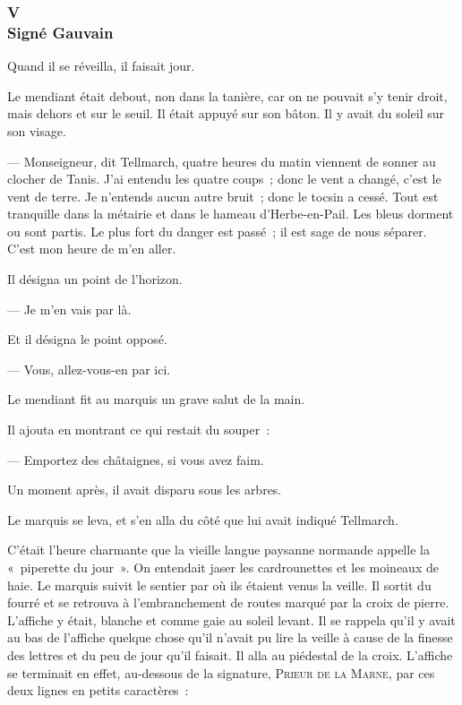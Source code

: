 \documentclass[french,twoside]{book} %
\begin{document}
 \subsubsection[{V. Signé Gauvain}]{V \\
Signé Gauvain}
\label{p1l4c5}
\noindent Quand il se réveilla, il faisait jour.\par
Le mendiant était debout, non dans la tanière, car on ne pouvait s’y tenir droit, mais dehors et sur le seuil. Il était appuyé sur son bâton. Il y avait du soleil sur son visage.\par
— Monseigneur, dit Tellmarch, quatre heures du matin viennent de sonner au clocher de Tanis. J’ai entendu les quatre coups ; donc le vent a changé, c’est le vent de terre. Je n’entends aucun autre bruit ; donc le tocsin a cessé. Tout est tranquille dans la métairie et dans le hameau d’Herbe-en-Pail. Les bleus dorment ou sont partis. Le plus fort du danger est passé ; il est sage de nous séparer. C’est mon heure de m’en aller.\par
Il désigna un point de l’horizon.\par
— Je m’en vais par là.\par
Et il désigna le point opposé.\par
— Vous, allez-vous-en par ici.\par
Le mendiant fit au marquis un grave salut de la main.\par
Il ajouta en montrant ce qui restait du souper :\par
— Emportez des châtaignes, si vous avez faim.\par
 Un moment après, il avait disparu sous les arbres.\par
Le marquis se leva, et s’en alla du côté que lui avait indiqué Tellmarch.\par
C’était l’heure charmante que la vieille langue paysanne normande appelle la « piperette du jour ». On entendait jaser les cardrounettes et les moineaux de haie. Le marquis suivit le sentier par où ils étaient venus la veille. Il sortit du fourré et se retrouva à l’embranchement de routes marqué par la croix de pierre. L’affiche y était, blanche et comme gaie au soleil levant. Il se rappela qu’il y avait au bas de l’affiche quelque chose qu’il n’avait pu lire la veille à cause de la finesse des lettres et du peu de jour qu’il faisait. Il alla au piédestal de la croix. L’affiche se terminait en effet, au-dessous de la signature, P{\scshape rieur de la} M{\scshape arne}, par ces deux lignes en petits caractères :\par
\end{document}
